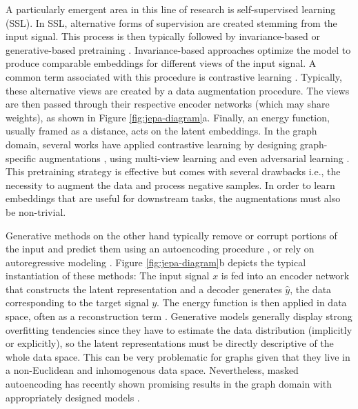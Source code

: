 \documentclass{article} \usepackage{iclr2024_conference,times}
\begin{document}
A particularly emergent area in this line of research is self-supervised learning (SSL). In SSL, alternative forms of supervision are created stemming from the input signal. This process is then typically followed by invariance-based or generative-based pretraining \citep{liu2023sslsurvey,assran2023self}. Invariance-based approaches optimize the model to produce comparable embeddings for different views of the input signal. A common term associated with this procedure is contrastive learning \citep{tian2020makes}. Typically, these alternative views are created by a data augmentation procedure. The views are then passed through their respective encoder networks (which may share weights), as shown in Figure \ref{fig:jepa-diagram}a. Finally, an energy function, usually framed as a distance, acts on the latent embeddings. In the graph domain, several works have applied contrastive learning by designing graph-specific augmentations \citep{you2020graph}, using multi-view learning \citep{hassani2020contrastive} and even adversarial learning \citep{suresh2021adversarial}. This pretraining strategy is effective but comes with several drawbacks i.e., the necessity to augment the data and process negative samples. In order to learn embeddings that are useful for downstream tasks, the augmentations must also be non-trivial.

Generative methods on the other hand typically remove or corrupt portions of the input and predict them using an autoencoding procedure \citep{vincent2010stacked,he2022masked}, or rely on autoregressive modeling \citep{brown2020language,hu2020gpt}. Figure \ref{fig:jepa-diagram}b depicts the typical instantiation of these methods: The input signal $x$ is fed into an encoder network that constructs the latent representation and a decoder generates $\hat{y}$, the data corresponding to the target signal $y$. The energy function is then applied in data space, often as a reconstruction term \citep{bengio2013representation}. Generative models generally display strong overfitting tendencies since they have to estimate the data distribution (implicitly or explicitly), so the latent representations must be directly descriptive of the whole data space. This can be very problematic for graphs given that they live in a non-Euclidean and inhomogenous data space. Nevertheless, masked autoencoding has recently shown promising results in the graph domain with appropriately designed models \citep{hou2022graphmae,tan2023s2gae}. 
\end{document}

